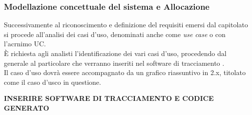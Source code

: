     \subsubsection{Modellazione concettuale del sistema e Allocazione}
      Successivamente al riconoscimento e definizione del requisiti emersi dal capitolato si procede all'analisi dei casi d'uso, denominati anche come
      \emph{use case} o con l'acrnimo UC.\\
      È richiesta agli analisti l'identificazione dei vari casi d'uso, procedendo dal generale al particolare che verranno inseriti nel software di tracciamento
      .\\
      Il caso d'uso dovrà essere accompagnato da un grafico riassuntivo in 2.x, titolato come il caso d'usco in questione.\\
      \begin{center}
        \textbf{\large{INSERIRE SOFTWARE DI TRACCIAMENTO E CODICE GENERATO}}
      \end{center}
